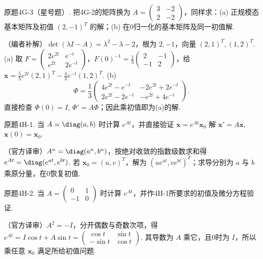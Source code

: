 \begin{exercise}\label{cw:bank-4G-3}原题4G-3（星号题）. 把4G-2的矩阵换为 $A=\begin{pmatrix}3&-2\\2&-2\end{pmatrix}$，同样求：(a) 正规模态基本矩阵及初值 $(2,-1)^T$ 的解；(b) 在0归一化的基本矩阵及同一初值解.\end{exercise}
\begin{solution}（编者补解）$\det(\lambda I-A)=\lambda^2-\lambda-2$，根为 $2,-1$，向量 $(2,1)^T,(1,2)^T$. (a) 取 $F=\begin{pmatrix}2e^{2t}&e^{-t}\\e^{2t}&2e^{-t}\end{pmatrix}$，$F(0)^{-1}=\frac13\begin{pmatrix}2&-1\\-1&2\end{pmatrix}$，给 $\mathbf x=\frac53e^{2t}(2,1)^T-\frac43e^{-t}(1,2)^T$. (b)
\[\Phi=\frac13\begin{pmatrix}4e^{2t}-e^{-t}&-2e^{2t}+2e^{-t}\\2e^{2t}-2e^{-t}&-e^{2t}+4e^{-t}\end{pmatrix}.\]
直接检查 $\Phi(0)=I$, $\Phi'=A\Phi$；因此乘初值即为(a)的解.\end{solution}
\begin{exercise}\label{cw:bank-4H-1}原题4H-1. 当 $A=\diag(a,b)$ 时计算 $e^{At}$，并直接验证 $\mathbf x=e^{At}\mathbf x_0$ 解 $\mathbf x'=A\mathbf x$, $\mathbf x(0)=\mathbf x_0$.\end{exercise}
\begin{solution}（官方译审）$A^n=\diag(a^n,b^n)$，按绝对收敛的指数级数求和得 $e^{At}=\diag(e^{at},e^{bt})$. 若 $\mathbf x_0=(u,v)^T$，解为 $(ue^{at},ve^{bt})^T$；求导分别为 $a$ 与 $b$ 乘原分量，在0恢复初值.\end{solution}
\begin{exercise}\label{cw:bank-4H-2}原题4H-2. 当 $A=\begin{pmatrix}0&1\\-1&0\end{pmatrix}$ 时计算 $e^{At}$，并作4H-1所要求的初值及微分方程验证.\end{exercise}
\begin{solution}（官方译审）$A^2=-I$，分开偶数与奇数次项，得 $e^{At}=I\cos t+A\sin t=\begin{pmatrix}\cos t&\sin t\\-\sin t&\cos t\end{pmatrix}$. 其导数为 $A$ 乘它，且0时为 $I$，所以乘任意 $\mathbf x_0$ 满足所给初值问题.\end{solution}
